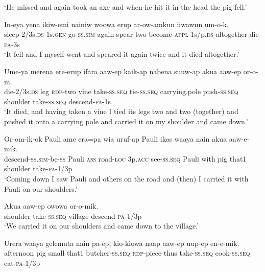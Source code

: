 {\glt ‘He missed and again took an axe and when he hit it in the head the pig fell.’ \\
\z


\ea\label{ex:a:x23}
\gll  In-eya  yena  ikiw-emi  nainiw  woowa  erup  ar-ow-amkun           iiwawun  um-o-k. \\
sleep-2/3s.\textsc{ds}  1s.\textsc{gen}  go-\textsc{ss}.\textsc{sim}  again  spear  two  become-\textsc{appl}-1s/p.\textsc{ds} altogether  die-\textsc{pa}-3s \\


\glt ‘It fell and I myself went and speared it again twice and it died altogether.’ \\
\z


\ea\label{ex:a:x24}
\gll  Ume-ya  merena  ere-erup  ifara  aaw-ep  kaik-ap  nabena            suuw-ap  akua  aaw-ep  or-o-m. \\
die-2/3s.\textsc{ds}  leg  \textsc{rdp}-two  vine  take-\textsc{ss.seq}  tie-\textsc{ss.seq}  carrying.pole   push-\textsc{ss.seq}  shoulder  take-\textsc{ss.seq}  descend-\textsc{pa}-1s \\


\glt ‘It died, and having taken a vine I tied its legs two and two (together) and pushed it onto a carrying pole and carried it on my shoulder and came down.’ \\
\z


\ea\label{ex:a:x25}
\gll  Or-om-ik-ok  Pauli  ame  era=pa  wia  uruf-ap  Pauli  ikos             waaya  nain  akua  aaw-e-mik. \\
descend-\textsc{ss}.\textsc{sim}-be-\textsc{ss}  Pauli  \textsc{ass}  road-\textsc{loc}  3p.\textsc{acc}  see-\textsc{ss.seq}  Pauli  with  pig  that1  shoulder  take-\textsc{pa}-1/3p \\


\glt ‘Coming down I saw Pauli and others on the road and (then) I carried it with Pauli on our shoulders.’ \\
\z


\ea\label{ex:a:x26}
\gll  Akua  aaw-ep  owowa  or-o-mik. \\
shoulder  take-\textsc{ss.seq}  village  descend-\textsc{pa}-1/3p \\
\glt ‘We carried it on our shoulders and came down to the village.’ \\
\z


\ea\label{ex:a:x27}
\gll  Urera  waaya  gelemuta  nain  pa-ep,  kio-kiowa  naap  aaw-ep         uup-ep  en-e-mik. \\
afternoon  pig  small  that1  butcher-\textsc{ss.seq}  \textsc{rdp}-piece  thus  take-\textsc{ss.seq}  cook-\textsc{ss.seq}  eat-\textsc{pa}-1/3p \\


}
